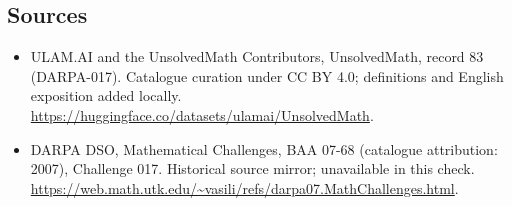\documentclass[11pt]{article}
\begin{document}
\subsection{Sources}
\begin{itemize}
\item[\hypertarget{source:83:1}{S1}] ULAM.AI and the UnsolvedMath Contributors, UnsolvedMath, record 83 (DARPA-017). Catalogue curation under CC BY 4.0; definitions and English exposition added locally.
\url{https://huggingface.co/datasets/ulamai/UnsolvedMath}.
\item[\hypertarget{source:83:2}{S2}] DARPA DSO, Mathematical Challenges, BAA 07-68 (catalogue attribution: 2007), Challenge 017. Historical source mirror; unavailable in this check.
\url{https://web.math.utk.edu/~vasili/refs/darpa07.MathChallenges.html}.
\end{itemize}
\label{end:83}
\end{document}
